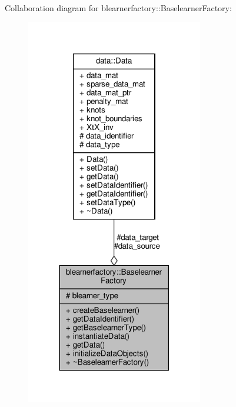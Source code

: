 Collaboration diagram for blearnerfactory\+:\+:Baselearner\+Factory\+:\nopagebreak
\begin{figure}[H]
\begin{center}
\leavevmode
\includegraphics[width=219pt]{classblearnerfactory_1_1_baselearner_factory__coll__graph}
\end{center}
\end{figure}

